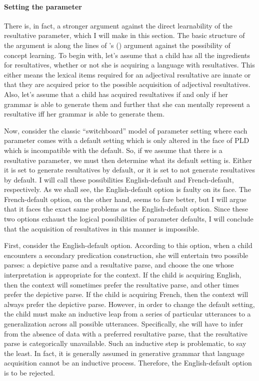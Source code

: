 \paragraph{Setting the parameter}
There is, in fact, a stronger argument against the direct learnability of the resultative parameter, which I will make in this section.
The basic structure of the argument is along the lines of \citeauthor{fodor1975language}'s (\citeyear{fodor1975language}) argument against the possibility of concept learning.
To begin with, let's assume that a child has all the ingredients for resultatives, whether or not she is acquiring a language with resultatives.
This either means the lexical items required for an adjectival resultative are innate or that they are acquired prior to the possible acquisition of adjectival resultatives.
Also, let's assume that a child has acquired resultatives if and only if her grammar is able to generate them and further that she can mentally represent a resultative iff her grammar is able to generate them.

Now, consider the classic ``switchboard'' model of parameter setting where each parameter comes with a default setting which is only altered in the face of PLD which is incompatible with the default.
So, if we assume that there is a resultative parameter, we must then determine what its default setting is.
Either it is set to generate resultatives by default, or it is set to not generate resultatives by default.
I will call these possibilities English-default and French-default, respectively.
As we shall see, the English-default option is faulty on its face.
The French-default option, on the other hand, seems to fare better, but I will argue that it faces the exact same problems as the English-default option.
Since these two options exhaust the logical possibilities of parameter defaults, I will conclude that the acquisition of resultatives in this manner is impossible.

First, consider the English-default option.
According to this option, when a child encounters a secondary predication construction, she will entertain two possible parses: a depictive parse and a resultative parse, and choose the one whose interpretation is appropriate for the context.
If the child is acquiring English, then the context will sometimes prefer the resultative parse, and other times prefer the depictive parse.
If the child is acquiring French, then the context will always prefer the depictive parse.
However, in order to change the default setting, the child must make an inductive leap from a series of particular utterances to a generalization across all possible utterances.
Specifically, she will have to infer from the absence of data with a preferred resultative parse, that the resultative parse is categorically unavailable.
Such an inductive step is problematic, to say the least.
In fact, it is generally assumed in generative grammar that language acquisition cannot be an inductive process. \parencite{fodor1980fixation,chomsky1980stating}
Therefore, the English-default option is to be rejected.

